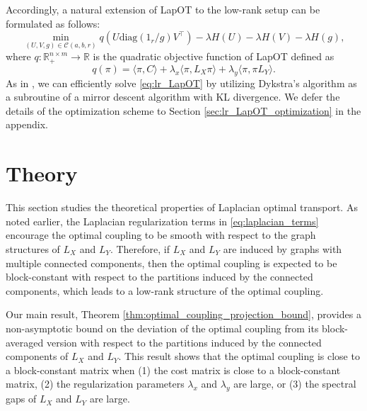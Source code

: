 \documentclass{article}
\theoremstyle{definition}
\newcommand{\cC}{\mathcal{C}}
\newcommand{\R}{\mathbb{R}}
\begin{document}
Accordingly, a natural extension of LapOT to the low-rank setup can be formulated as follows:
\begin{equation}
    \label{eq:lr_LapOT}
    \min_{(U, V, g) \in \cC(a, b, r)} q(U \mathrm{diag}(1_r / g) V^\top) - \lambda H(U) - \lambda H(V) - \lambda H(g),
\end{equation}
where $q \colon \R_+^{n \times m} \to \R$ is the quadratic objective function of LapOT defined as
\begin{equation*}
    q(\pi) = \langle \pi, C \rangle + \lambda_x \langle \pi, L_X \pi \rangle + \lambda_y \langle \pi, \pi L_Y \rangle.
\end{equation*}
As in \cite{scetbon2021low}, we can efficiently solve \eqref{eq:lr_LapOT} by utilizing Dykstra's algorithm as a subroutine of a mirror descent algorithm with KL divergence. We defer the details of the optimization scheme to Section \ref{sec:lr_LapOT_optimization} in the appendix.


\section{Theory}
\label{sec:theory}
This section studies the theoretical properties of Laplacian optimal transport. As noted earlier, the Laplacian regularization terms in \eqref{eq:laplacian_terms} encourage the optimal coupling to be smooth with respect to the graph structures of $L_X$ and $L_Y$. Therefore, if $L_X$ and $L_Y$ are induced by graphs with multiple connected components, then the optimal coupling is expected to be block-constant with respect to the partitions induced by the connected components, which leads to a low-rank structure of the optimal coupling. 

Our main result, Theorem \ref{thm:optimal_coupling_projection_bound}, provides a non-asymptotic bound on the deviation of the optimal coupling from its block-averaged version with respect to the partitions induced by the connected components of $L_X$ and $L_Y$. This result shows that the optimal coupling is close to a block-constant matrix when (1) the cost matrix is close to a block-constant matrix, (2) the regularization parameters $\lambda_x$ and $\lambda_y$ are large, or (3) the spectral gaps of $L_X$ and $L_Y$ are large.
\end{document}
